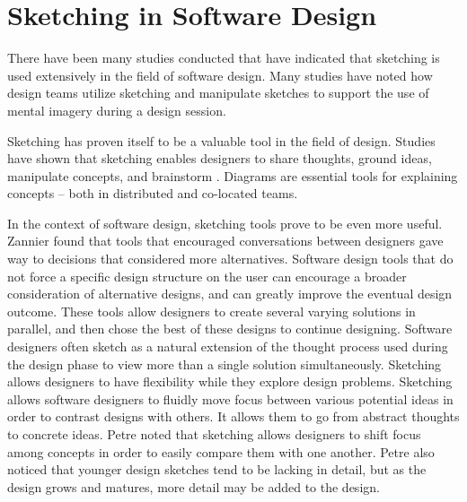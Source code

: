 \section{Sketching in Software Design}

There have been many studies conducted that have indicated that sketching is used extensively in the field of software design\cite{dekel}. Many studies have noted how design teams utilize sketching and manipulate sketches to support the use of mental imagery during a design session\cite{dekel}\cite{petre}.

Sketching has proven itself to be a valuable tool in the field of design. Studies have shown that sketching enables designers to share thoughts, ground ideas, manipulate concepts, and brainstorm \cite{cherubini}. Diagrams are essential tools for explaining concepts -- both in distributed and co-located teams\cite{yatani}.

In the context of software design, sketching tools prove to be even more useful. Zannier found that tools that encouraged conversations between designers gave way to decisions that considered more alternatives\cite{zannier}. Software design tools that do not force a specific design structure on the user can encourage a broader consideration of alternative designs, and can greatly improve the eventual design outcome\cite{zannier}. These tools allow designers to create several varying solutions in parallel, and then chose the best of these designs to continue designing. Software designers often sketch as a natural extension of the thought process used during the design phase to view more than a single solution simultaneously\cite{petre}. Sketching allows designers to have flexibility while they explore design problems. Sketching allows software designers to fluidly move focus between various potential ideas in order to contrast designs with others. It allows them to go from abstract thoughts to concrete ideas. Petre noted that sketching allows designers to shift focus among concepts in order to easily compare them with one another\cite{petre}. Petre also noticed that younger design sketches tend to be lacking in detail, but as the design grows and matures, more detail may be added to the design.
